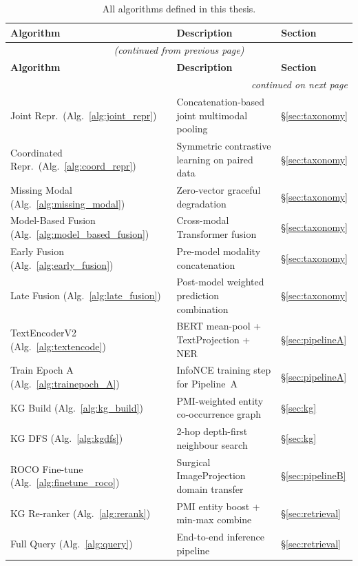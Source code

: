 \documentclass[12pt,a4paper]{article}
\theoremstyle{definition}
\theoremstyle{plain}
\theoremstyle{remark}
\begin{document}
\begin{longtable}{p{3.5cm}p{7.5cm}p{3.5cm}}
\caption{All algorithms defined in this thesis.}\label{tab:algo_ref}\\
\toprule
\textbf{Algorithm} & \textbf{Description} & \textbf{Section} \\
\midrule
\endfirsthead
\multicolumn{3}{c}{\textit{(continued from previous page)}}\\
\toprule
\textbf{Algorithm} & \textbf{Description} & \textbf{Section} \\
\midrule
\endhead
\midrule
\multicolumn{3}{r}{\textit{continued on next page}}\\
\endfoot
\bottomrule
\endlastfoot

Joint Repr.\ (Alg.~\ref{alg:joint_repr}) & Concatenation-based joint multimodal pooling & \S\ref{sec:taxonomy} \\[3pt]
Coordinated Repr.\ (Alg.~\ref{alg:coord_repr}) & Symmetric contrastive learning on paired data & \S\ref{sec:taxonomy} \\[3pt]
Missing Modal (Alg.~\ref{alg:missing_modal}) & Zero-vector graceful degradation & \S\ref{sec:taxonomy} \\[3pt]
Model-Based Fusion (Alg.~\ref{alg:model_based_fusion}) & Cross-modal Transformer fusion & \S\ref{sec:taxonomy} \\[3pt]
Early Fusion (Alg.~\ref{alg:early_fusion}) & Pre-model modality concatenation & \S\ref{sec:taxonomy} \\[3pt]
Late Fusion (Alg.~\ref{alg:late_fusion}) & Post-model weighted prediction combination & \S\ref{sec:taxonomy} \\[3pt]
TextEncoderV2 (Alg.~\ref{alg:textencode}) & BERT mean-pool + TextProjection + NER & \S\ref{sec:pipelineA} \\[3pt]
Train Epoch A (Alg.~\ref{alg:trainepoch_A}) & InfoNCE training step for Pipeline~A & \S\ref{sec:pipelineA} \\[3pt]
KG Build (Alg.~\ref{alg:kg_build}) & PMI-weighted entity co-occurrence graph & \S\ref{sec:kg} \\[3pt]
KG DFS (Alg.~\ref{alg:kgdfs}) & 2-hop depth-first neighbour search & \S\ref{sec:kg} \\[3pt]
ROCO Fine-tune (Alg.~\ref{alg:finetune_roco}) & Surgical ImageProjection domain transfer & \S\ref{sec:pipelineB} \\[3pt]
KG Re-ranker (Alg.~\ref{alg:rerank}) & PMI entity boost + min-max combine & \S\ref{sec:retrieval} \\[3pt]
Full Query (Alg.~\ref{alg:query}) & End-to-end inference pipeline & \S\ref{sec:retrieval} \\[3pt]

\end{longtable}
\end{document}
